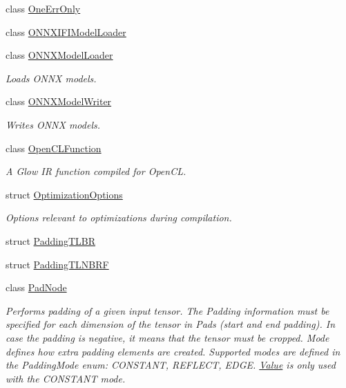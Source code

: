\begin{DoxyCompactItemize}
class \hyperlink{classglow_1_1_one_err_only}{One\+Err\+Only}
\item 
class \hyperlink{classglow_1_1_o_n_n_x_i_f_i_model_loader}{O\+N\+N\+X\+I\+F\+I\+Model\+Loader}
\item 
class \hyperlink{classglow_1_1_o_n_n_x_model_loader}{O\+N\+N\+X\+Model\+Loader}
\begin{DoxyCompactList}\small\item\em Loads O\+N\+NX models. \end{DoxyCompactList}\item 
class \hyperlink{classglow_1_1_o_n_n_x_model_writer}{O\+N\+N\+X\+Model\+Writer}
\begin{DoxyCompactList}\small\item\em Writes O\+N\+NX models. \end{DoxyCompactList}\item 
class \hyperlink{classglow_1_1_open_c_l_function}{Open\+C\+L\+Function}
\begin{DoxyCompactList}\small\item\em A Glow IR function compiled for Open\+CL. \end{DoxyCompactList}\item 
struct \hyperlink{structglow_1_1_optimization_options}{Optimization\+Options}
\begin{DoxyCompactList}\small\item\em Options relevant to optimizations during compilation. \end{DoxyCompactList}\item 
struct \hyperlink{structglow_1_1_padding_t_l_b_r}{Padding\+T\+L\+BR}
\item 
struct \hyperlink{structglow_1_1_padding_t_l_n_b_r_f}{Padding\+T\+L\+N\+B\+RF}
\item 
class \hyperlink{classglow_1_1_pad_node}{Pad\+Node}
\begin{DoxyCompactList}\small\item\em Performs padding of a given input tensor. The Padding information must be specified for each dimension of the tensor in Pads (start and end padding). In case the padding is negative, it means that the tensor must be cropped. Mode defines how extra padding elements are created. Supported modes are defined in the Padding\+Mode enum\+: C\+O\+N\+S\+T\+A\+NT, R\+E\+F\+L\+E\+CT, E\+D\+GE. \hyperlink{classglow_1_1_value}{Value} is only used with the C\+O\+N\+S\+T\+A\+NT mode. \end{DoxyCompactList}\item 

\end{DoxyCompactItemize}
